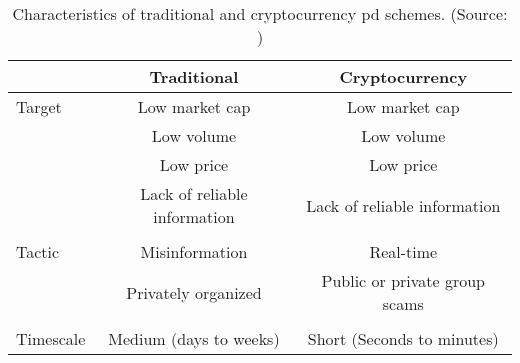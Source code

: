 \begin{table}[ht]
    \centering
    \begin{tabular}{l c c}
    \hline
     &\textbf{Traditional} & \textbf{Cryptocurrency}\\
    \hline
     Target   & Low market cap & Low market cap \\
              & Low volume     & Low volume \\
              & Low price      & Low price \\
              & Lack of reliable information & Lack of reliable information\\
              \\
    Tactic    & Misinformation & Real-time\\
              & Privately organized & Public or private group scams\\
              \\
    Timescale & Medium (days to weeks) & Short (Seconds to minutes)\\
    \hline
    \end{tabular}
    \caption{Characteristics of traditional and cryptocurrency \ac{pd} schemes. (Source: \cite{P&D_to_the_moon})}
    \label{tab:pd_characteristics}
\end{table}